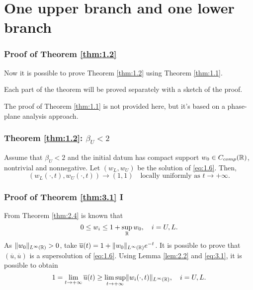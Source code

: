 \section{One upper branch and one lower branch}


\begin{frame}
    \frametitle{Proof of Theorem \ref{thm:1.2}}
    Now it is possible to prove Theorem \ref{thm:1.2} using Theorem \ref{thm:1.1}.
    
    Each part of the theorem will be proved separately with a sketch of the proof.

    The proof of Theorem \ref{thm:1.1} is not provided here, but it's based on a phase-plane analysis approach.

\end{frame}


\begin{frame}
    \frametitle{Theorem \ref{thm:1.2}: \texorpdfstring{\(\beta_U < 2\)}{betaU < 2}}
    \begin{theorem}
        Assume that \(\beta_U < 2\) and the initial datum has compact support \(w_{0} \in C_{comp}(\mathbb{R})\), nontrivial and nonnegative. Let \((w_L, w_{U})\) be the solution of \eqref{eq:1.6}. Then,
        \[
            (w_L(\cdot, t), w_{U}(\cdot, t)) \to (1, 1) \quad \text{locally uniformly as } t \to +\infty.
        \]
        \label{thm:3.1} 
    \end{theorem}
\end{frame}


\begin{frame}
    \frametitle{Proof of Theorem \ref{thm:3.1} I}
    \begin{proofs}
        From Theorem \ref{thm:2.4} is known that 
    \begin{equation}
        0 \leq w_{i} \leq 1 + \sup_{\mathbb{R}} w_{0}, \quad i = U, L.
        \label{eq:3.1}
    \end{equation}
    As \(\lVert w_{0}\rVert_{L^{\infty}(\mathbb{R})} > 0\), take \(\overline{u}(t) = 1 + \lVert w_{0}\rVert_{L^{\infty}(\mathbb{R})}e^{-t}\). 
    It is possible to prove that \((\overline{u}, \overline{u})\) is a supersolution of \eqref{eq:1.6}. Using Lemma \ref{lem:2.2} and \eqref{eq:3.1}, it is possible to obtain 
    \begin{equation}
        1 = \lim_{t \to +\infty} \overline{u}(t) \geq \limsup_{t \to +\infty} \lVert w_i(\cdot, t)\rVert_{L^{\infty}(\mathbb{R})}, \quad i = U, L.
        \label{eq:3.2}
    \end{equation}
    \end{proofs}
\end{frame}

